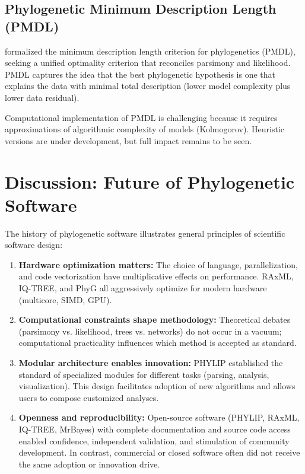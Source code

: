 \subsection{Phylogenetic Minimum Description Length (PMDL)}

\textcite{wheeler2025} formalized the minimum description length criterion for phylogenetics (PMDL), seeking a unified optimality criterion that reconciles parsimony and likelihood. PMDL captures the idea that the best phylogenetic hypothesis is one that explains the data with minimal total description (lower model complexity plus lower data residual).

Computational implementation of PMDL is challenging because it requires approximations of algorithmic complexity of models (Kolmogorov). Heuristic versions are under development, but full impact remains to be seen.

\section{Discussion: Future of Phylogenetic Software}

The history of phylogenetic software illustrates general principles of scientific software design:

\begin{enumerate}
\item \textbf{Hardware optimization matters:} The choice of language, parallelization, and code vectorization have multiplicative effects on performance. RAxML, IQ-TREE, and PhyG all aggressively optimize for modern hardware (multicore, SIMD, GPU).

\item \textbf{Computational constraints shape methodology:} Theoretical debates (parsimony vs. likelihood, trees vs. networks) do not occur in a vacuum; computational practicality influences which method is accepted as standard.

\item \textbf{Modular architecture enables innovation:} PHYLIP established the standard of specialized modules for different tasks (parsing, analysis, visualization). This design facilitates adoption of new algorithms and allows users to compose customized analyses.

\item \textbf{Openness and reproducibility:} Open-source software (PHYLIP, RAxML, IQ-TREE, MrBayes) with complete documentation and source code access enabled confidence, independent validation, and stimulation of community development. In contrast, commercial or closed software often did not receive the same adoption or innovation drive.

\end{enumerate}

